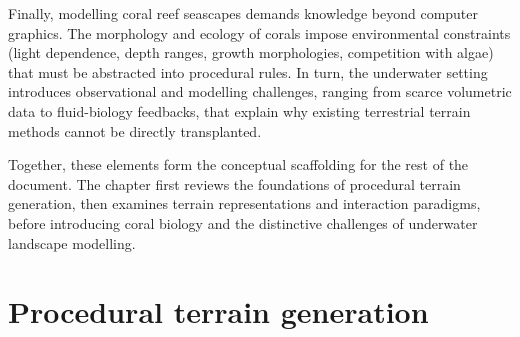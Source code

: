 Finally, modelling coral reef seascapes demands knowledge beyond computer graphics. The morphology and ecology of corals impose environmental constraints (light dependence, depth ranges, growth morphologies, competition with algae) that must be abstracted into procedural rules. In turn, the underwater setting introduces observational and modelling challenges, ranging from scarce volumetric data to fluid-biology feedbacks, that explain why existing terrestrial terrain methods cannot be directly transplanted.

Together, these elements form the conceptual scaffolding for the rest of the document. The chapter first reviews the foundations of procedural terrain generation, then examines terrain representations and interaction paradigms, before introducing coral biology and the distinctive challenges of underwater landscape modelling.




\section{Procedural terrain generation}
\label{sec:state-of-the-art_procedural-generation}


